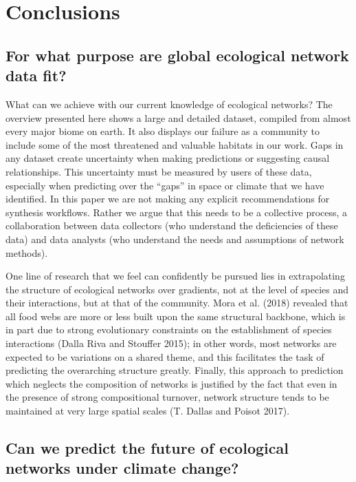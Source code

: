 \documentclass[11pt]{article}
\begin{document}
\hypertarget{conclusions}{%
\section{Conclusions}\label{conclusions}}

\hypertarget{for-what-purpose-are-global-ecological-network-data-fit}{%
\subsection{For what purpose are global ecological network data
fit?}\label{for-what-purpose-are-global-ecological-network-data-fit}}

What can we achieve with our current knowledge of ecological networks?
The overview presented here shows a large and detailed dataset, compiled
from almost every major biome on earth. It also displays our failure as
a community to include some of the most threatened and valuable habitats
in our work. Gaps in any dataset create uncertainty when making
predictions or suggesting causal relationships. This uncertainty must be
measured by users of these data, especially when predicting over the
``gaps'' in space or climate that we have identified. In this paper we
are not making any explicit recommendations for synthesis workflows.
Rather we argue that this needs to be a collective process, a
collaboration between data collectors (who understand the deficiencies
of these data) and data analysts (who understand the needs and
assumptions of network methods).

One line of research that we feel can confidently be pursued lies in
extrapolating the structure of ecological networks over gradients, not
at the level of species and their interactions, but at that of the
community. Mora et al. (2018) revealed that all food webs are more or
less built upon the same structural backbone, which is in part due to
strong evolutionary constraints on the establishment of species
interactions (Dalla Riva and Stouffer 2015); in other words, most
networks are expected to be variations on a shared theme, and this
facilitates the task of predicting the overarching structure greatly.
Finally, this approach to prediction which neglects the composition of
networks is justified by the fact that even in the presence of strong
compositional turnover, network structure tends to be maintained at very
large spatial scales (T. Dallas and Poisot 2017).

\hypertarget{can-we-predict-the-future-of-ecological-networks-under-climate-change}{%
\subsection{Can we predict the future of ecological networks under
climate
change?}\label{can-we-predict-the-future-of-ecological-networks-under-climate-change}}
\end{document}
